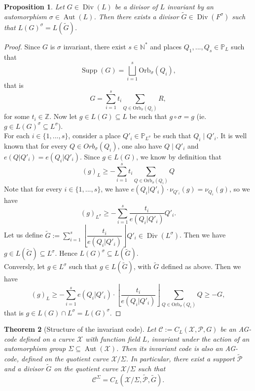 \documentclass[10pt]{article}
\newtheorem{thm}{Theorem}
\newtheorem{prop1}[thm]{Proposition}
\newcommand{\s}{\vspace{0.3cm}}
\newcommand{\cd}{\cdot}
\newcommand{\N}{\mathbb{N}}
\newcommand{\Z}{\mathbb{Z}}
\newcommand{\PP}{\mathbb{P}}
\newcommand{\su}{\subseteq}
\newcommand{\X}{\mathcal{X}}
\newcommand{\PR}{\mathcal{P}}
\newcommand{\Div}{\operatorname{Div}}
\newcommand{\Supp}{\operatorname{Supp}}
\newcommand{\Aut}{\operatorname{Aut}}
\newcommand{\hugues}[1]{\textcolor{blue}{#1}}
\newcommand{\notehugues}[1]{\marginpar{\small\hugues{#1}}}
\begin{document}
\s

\begin{prop1} \label{invrr}
Let $G \in \Div(L)$ be a divisor of $L$ invariant by an automorphism $\sigma \in \Aut(L)$.
\notehugues{est-ce le même $\tilde{G}$ que dans la Déf.~\ref{pousséavant}~?}
Then there exists a divisor $\tilde{G} \in \Div(F^{\sigma})$ such that $L(G)^{\sigma} = L(\tilde{G})$.
\end{prop1}

\s

\begin{proof}
Since $G$ is $\sigma$ invariant, there exist $s \in \N^*$ and places $Q_1,...,Q_s \in \PP_L$ such that 
\[\Supp(G) = \bigsqcup_{i=1}^s \mathrm{Orb}_{\sigma}(Q_i),\]
that is 
\[G = \sum\limits_{i=1}^s t_i \sum\limits_{Q \in \mathrm{Orb}_{\sigma}(Q_i)} R,\]
for some $t_i \in \Z$. Now let $g \in L(G) \su L$ be such that $g \circ \sigma = g$ (ie. $g \in L(G)^{\sigma} \su L^{\sigma}$). \\
For each $i \in \{1,...,s\}$, consider a place $Q'_i \in \PP_{L^{\sigma}}$ be such that $Q_i \mid Q'_i$. It is well known that for every $Q \in Orb_{\sigma}(Q_i)$, one also have $Q \mid Q'_i$ and $e(Q|Q'_i)=e(Q_i|Q'_i)$. Since $g \in L(G)$, we know by definition that
\[(g)_L \geq - \sum\limits_{i=1}^s t_i \sum\limits_{Q \in \mathrm{Orb}_{\sigma}(Q_i)} Q\]
Note that for every $i \in \{1,...,s\}$, we have $e(Q_i|Q'_i) \cd \nu_{Q'_i}(g) = \nu_{Q_i}(g)$, so we have 
\[(g)_{L^{\sigma}} \geq - \sum\limits_{i=1}^s \dfrac{t_i}{e(Q_i|Q'_i)}  Q'_i.\]
Let us define $\tilde{G}:= \sum\limits_{i=1}^s \left\lfloor\dfrac{t_i}{e(Q_i|Q'_i)}\right\rfloor  Q'_i \in \Div(L^{\sigma})$. Then we have $g \in L(\tilde{G}) \su L^{\sigma}$. Hence $L(G)^{\sigma} \su L(\tilde{G})$. \\
Conversly, let $g \in L^{\sigma}$ such that $g \in L(\tilde{G})$, with $\tilde{G}$ defined as above. Then we have 
\[ (g)_L \geq -\sum\limits_{i=1}^s e(Q_i|Q'_i) \cd \left\lfloor\dfrac{t_i}{e(Q_i|Q'_i)}\right\rfloor \sum\limits_{Q \in \mathrm{Orb}_{\sigma}(Q_i)} Q \geq -G,\]
that is $g \in L(G) \cap L^{\sigma} = L(G)^{\sigma}$.
\end{proof}

\s

\begin{thm} [Structure of the invariant code] \label{invstruct}
Let $\mathcal{C} := C_L(\X,\PR,G)$ be an AG-code defined on a curve $\X$ with function field $L$, invariant under the action of an automorphism group $\Sigma \su \Aut(\X)$. Then its invariant code is also an AG-code, defined on the quotient curve $\X/\Sigma$. In particular, there exist a support $\tilde{\PR}$ and a divisor $\tilde{G}$ on the quotient curve $\X/\Sigma$ such that
\[\mathcal{C}^{\Sigma} = C_L(\X/\Sigma,\tilde{\PR},\tilde{G}).\]
\end{thm}
\end{document}
